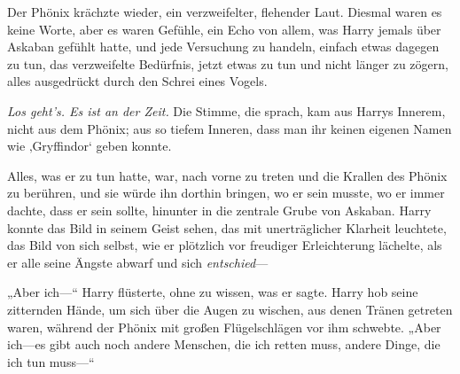 Der Phönix krächzte wieder, ein verzweifelter, flehender Laut. Diesmal waren es keine Worte, aber es waren Gefühle, ein Echo von allem, was Harry jemals über Askaban gefühlt hatte, und jede Versuchung zu handeln, einfach etwas dagegen zu tun, das verzweifelte Bedürfnis, jetzt etwas zu tun und nicht länger zu zögern, alles ausgedrückt durch den Schrei eines Vogels.

\emph{Los geht’s. Es ist an der Zeit.}
Die Stimme, die sprach, kam aus Harrys Innerem, nicht aus dem Phönix; aus so tiefem Inneren, dass man ihr keinen eigenen Namen wie ‚Gryffindor‘ geben konnte.

Alles, was er zu tun hatte, war, nach vorne zu treten und die Krallen des Phönix zu berühren, und sie würde ihn dorthin bringen, wo er sein musste, wo er immer dachte, dass er sein sollte, hinunter in die zentrale Grube von Askaban. Harry konnte das Bild in seinem Geist sehen, das mit unerträglicher Klarheit leuchtete, das Bild von sich selbst, wie er plötzlich vor freudiger Erleichterung lächelte, als er alle seine Ängste abwarf und sich \emph{entschied}—

„Aber ich—“ Harry flüsterte, ohne zu wissen, was er sagte. Harry hob seine zitternden Hände, um sich über die Augen zu wischen, aus denen Tränen getreten waren, während der Phönix mit großen Flügelschlägen vor ihm schwebte.
„Aber ich—es gibt auch noch andere Menschen, die ich retten muss, andere Dinge, die ich tun muss—“


